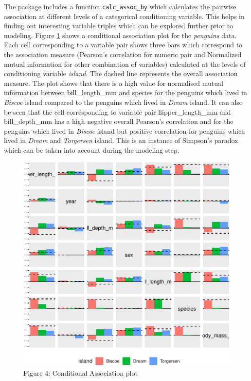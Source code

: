 The package includes a function \texttt{calc\_assoc\_by} which
calculates the pairwise association at different levels of a categorical
conditioning variable. This helps in finding out interesting variable
triples which can be explored further prior to modeling. Figure
\ref{fig:cond-assoc} shows a conditional association plot for the
\emph{penguins} data. Each cell corresponding to a variable pair shows
three bars which correspond to the association measure (Pearson's
correlation for numeric pair and Normalized mutual information for other
combination of variables) calculated at the levels of conditioning
variable \emph{island}. The dashed line represents the overall
association measure. The plot shows that there is a high value for
normalised mutual information between bill\_length\_mm and species for
the penguins which lived in \emph{Biscoe} island compared to the
penguins which lived in \emph{Dream} island. It can also be seen that
the cell corresponding to variable pair flipper\_length\_mm and
bill\_depth\_mm has a high negative overall Pearson's correlation and
for the penguins which lived in \emph{Biscoe} island but positive
correlation for penguins which lived in \emph{Dream} and
\emph{Torgersen} island. This is an instance of Simpson's paradox which
can be taken into account during the modeling step.

\begin{Schunk}
\begin{figure}

{\centering \includegraphics{rj_paper_files/figure-latex/cond-assoc-1} 

}

\caption[Figure 4]{Figure 4: Conditional Association plot}\label{fig:cond-assoc}
\end{figure}
\end{Schunk}


